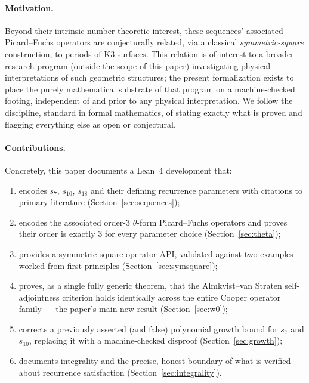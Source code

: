 \documentclass[11pt]{article}
\begin{document}
\paragraph{Motivation.} Beyond their intrinsic number-theoretic interest, these
sequences' associated Picard--Fuchs operators are conjecturally related, via a
classical \emph{symmetric-square} construction, to periods of K3 surfaces. This
relation is of interest to a broader research program (outside the scope of
this paper) investigating physical interpretations of such geometric
structures; the present formalization exists to place the purely mathematical
substrate of that program on a machine-checked footing, independent of and
prior to any physical interpretation. We follow the discipline, standard in
formal mathematics, of stating exactly what is proved and flagging everything
else as open or conjectural.

\paragraph{Contributions.} Concretely, this paper documents a Lean~4 development
that:
\begin{enumerate}[label=(\roman*)]
  \item encodes $s_7$, $s_{10}$, $s_{18}$ and their defining recurrence
    parameters with citations to primary literature (Section~\ref{sec:sequences});
  \item encodes the associated order-3 $\theta$-form Picard--Fuchs operators and
    proves their order is exactly 3 for every parameter choice
    (Section~\ref{sec:theta});
  \item provides a symmetric-square operator API, validated against two
    examples worked from first principles (Section~\ref{sec:symsquare});
  \item proves, as a single fully generic theorem, that the Almkvist--van
    Straten self-adjointness criterion holds identically across the entire
    Cooper operator family --- the paper's main new result
    (Section~\ref{sec:w0});
  \item corrects a previously asserted (and false) polynomial growth bound for
    $s_7$ and $s_{10}$, replacing it with a machine-checked disproof
    (Section~\ref{sec:growth});
  \item documents integrality and the precise, honest boundary of what is
    verified about recurrence satisfaction (Section~\ref{sec:integrality}).
\end{enumerate}
\end{document}
